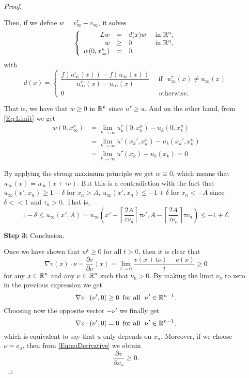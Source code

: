 \begin{proof}
\begin{itemize}
Then, if we define $w= v_\infty^\tau - v_\infty$, it solves
$$
\left\{\begin{array}{rcll}
L w &=& d(x) w  &\textrm{ in }\mathbb{R}^n,\\
w &\geq& 0  &\textrm{ in }\mathbb{R}^n,\\
w(0, x_\infty^n ) &=& 0,
\end{array} \right.
$$
with 
$$ d(x) = \begin{cases}
\dfrac{f(u_\infty^\tau(x))-f(u_\infty(x))}{u_\infty^\tau(x)-u_\infty(x)} \,\,\, &\text{if } \,\, u_\infty^\tau(x)\not=u_\infty(x)\\
0 \,\, & \text{otherwise}.
\end{cases} $$


That is, we have that $w\geq 0$ in $\mathbb{R}^n$ since $u^\tau \geq u$. And on the other hand, from \eqref{Eq:Limit} we get
\begin{align*}
w(0,x_\infty^n) &= \lim_{k\to\infty} u_k^\tau(0,x_k^n)- u_k(0,x_k^n) \\ 
&= \lim_{k\to\infty} u^\tau(x_k',x_k^n)- u_k(x_k',x_k^n) \\ 
&= \lim_{k\to\infty}  u^\tau(x_k)- u_k(x_k) = 0
\end{align*}

By applying the strong maximum principle we get $w\equiv 0$, which means that $u_\infty(x) = u_\infty(x+\tau\nu)$. But this is a contradiction with the fact that $u_\infty(x',x_n) \geq 1-\delta$ for $x_n>A$, $u_\infty(x',x_n) \leq -1+\delta$ for $x_n<-A$ since $\delta<<1$ and $\tau_n>0$. That is,
$$ 1-\delta \leq u_\infty(x',A) = u_\infty \left( x' - \left\lceil \frac{2A}{\tau\nu_n} \right\rceil \tau \nu', A - \left\lceil \frac{2A}{\tau\nu_n} \right\rceil \tau \nu_n\right) \leq -1+\delta. $$

\end{itemize}

\textbf{Step 3: }Conclusion.

Once we have shown that $w^t\geq 0$ for all $t>0$, then it is clear that
\begin{equation}
\label{Eq:nuDerivative}
\nabla v(x) \cdot \nu = \frac{\partial v}{\partial \nu} (x) = \lim_{t \to 0}  \dfrac{v(x+t\nu)-v(x)}{t} \geq 0
\end{equation}
for any $x\in \mathbb{R}^n$ and any $\nu\in \mathbb{R}^n$ such that $\nu_n>0$.
By making the limit $\nu_n$ to zero in the previous expression we get
$$ \nabla v \cdot (\nu',0) \geq 0 \,\,\, \text{for all } \,\, \nu'\in\mathbb{R}^{n-1}. $$
Choosing now the opposite vector $-\nu'$ we finally get
$$ \nabla v \cdot (\nu',0) = 0 \,\,\, \text{for all } \,\, \nu'\in\mathbb{R}^{n-1}, $$
which is equivalent to say that $u$ only depends on $x_n$. Moreover, if we choose $\nu = e_n$, then from \eqref{Eq:nuDerivative} we obtain
$$ \frac{\partial v}{\partial x_n} \geq 0. $$
\end{proof}






